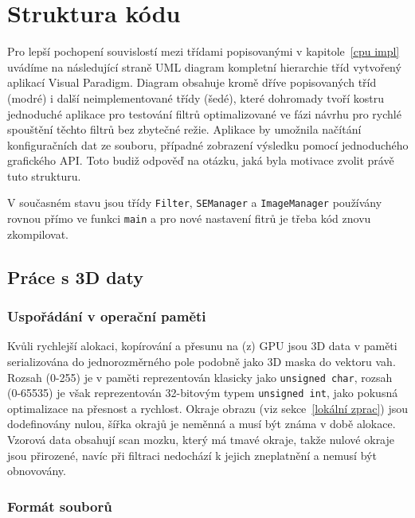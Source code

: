 
\chapter{Struktura kódu}\label{struktura kódu}

    Pro lepší pochopení souvislostí mezi třídami popisovanými v kapitole~\ref{cpu impl} uvádíme na následující straně UML diagram kompletní hierarchie tříd vytvořený aplikací Visual Paradigm. Diagram obsahuje kromě dříve popisovaných tříd (modré) i další neimplementované třídy (šedé), které dohromady tvoří kostru jednoduché aplikace pro testování filtrů optimalizované ve fázi návrhu pro rychlé spouštění těchto filtrů bez zbytečné režie. Aplikace by umožnila načítání konfiguračních dat ze souboru, případné zobrazení výsledku pomocí jednoduchého grafického API. Toto budiž odpověď na otázku, jaká byla motivace zvolit právě tuto strukturu.

    V současném stavu jsou třídy {\tt Filter}, {\tt SEManager} a {\tt ImageManager} používány rovnou přímo ve funkci {\tt main} a pro nové nastavení fitrů je třeba kód znovu zkompilovat.

    \section{Práce s 3D daty}

        \subsection{Uspořádání v operační paměti}

        Kvůli rychlejší alokaci, kopírování a přesunu na (z) GPU jsou 3D data v paměti serializována do jednorozměrného pole podobně jako 3D maska do vektoru vah. Rozsah (0-255) je v paměti reprezentován klasicky jako {\tt unsigned char}, rozsah (0-65535) je však reprezentován 32-bitovým typem {\tt unsigned int}, jako pokusná optimalizace na přesnost a rychlost. Okraje obrazu (viz sekce~\ref{lokální zprac}) jsou dodefinovány nulou, šířka okrajů je neměnná a musí být známa v době alokace. Vzorová data obsahují scan mozku, který má tmavé okraje, takže nulové okraje jsou přirozené, navíc při filtraci nedochází k jejich zneplatnění a nemusí být obnovovány.

        \subsection{Formát souborů}


